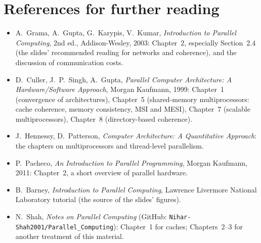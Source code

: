 \section{References for further reading}

\begin{itemize}
  \item A.~Grama, A.~Gupta, G.~Karypis, V.~Kumar, \emph{Introduction to Parallel Computing}, 2nd ed., Addison-Wesley, 2003: Chapter~2, especially
        Section~2.4 (the slides' recommended reading for networks and coherence), and the discussion of communication costs.
  \item D.~Culler, J.~P.~Singh, A.~Gupta, \emph{Parallel Computer Architecture: A Hardware/Software Approach}, Morgan Kaufmann, 1999:
        Chapter~1 (convergence of architectures), Chapter~5 (shared-memory multiprocessors: cache coherence, memory consistency, MSI and MESI),
        Chapter~7 (scalable multiprocessors), Chapter~8 (directory-based coherence).
  \item J.~Hennessy, D.~Patterson, \emph{Computer Architecture: A Quantitative Approach}: the chapters on multiprocessors and thread-level parallelism.
  \item P.~Pacheco, \emph{An Introduction to Parallel Programming}, Morgan Kaufmann, 2011: Chapter~2, a short overview of parallel hardware.
  \item B.~Barney, \emph{Introduction to Parallel Computing}, Lawrence Livermore National Laboratory tutorial (the source of the slides' figures).
  \item N.~Shah, \emph{Notes on Parallel Computing} (GitHub: \texttt{Nihar-Shah2001/Parallel\_Computing}): Chapter~1 for caches; Chapters~2--3 for another treatment of this material.
\end{itemize}